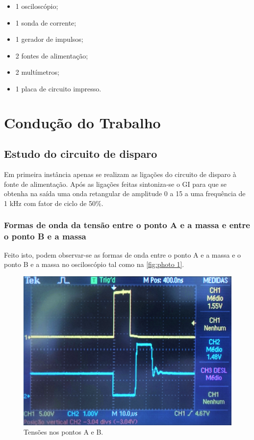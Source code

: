 \documentclass[a4paper,11pt]{article}
\numberwithin{equation}{section}
\begin{document}
\begin{itemize}
	\item 1 osciloscópio;
	\vspace{-2mm}	
	\item 1 sonda de corrente;
	\vspace{-2mm}	
	\item 1 gerador de impulsos;
	\vspace{-2mm}	
	\item 2 fontes de alimentação;
	\vspace{-2mm}	
	\item 2 multímetros;
	\vspace{-2mm}	
	\item 1 placa de circuito impresso.
\end{itemize}

\pagebreak

\section{Condução do Trabalho}

\subsection{Estudo do circuito de disparo}

Em primeira instância apenas se realizam as ligações do circuito de disparo à fonte de alimentação. Após as ligações feitas sintoniza-se o GI para que se obtenha na saída uma onda retangular de amplitude 0 a 15 a uma frequência de 1 kHz com fator de ciclo de 50\%.

\subsubsection{Formas de onda da tensão entre o ponto A e a massa e entre o ponto B e a massa}

Feito isto, podem observar-se as formas de onda entre o ponto A e a massa e o ponto B e a massa no osciloscópio tal como na \autoref{fig:photo 1}.

\begin{figure}[h]
	\centering
	\includegraphics[keepaspectratio=true, scale=0.14]{img/DSC0116}
	\caption{Tensões nos pontos A e B.}
	\label{fig:photo 1}
	\vspace{-0.8em}
\end{figure}
\end{document}
